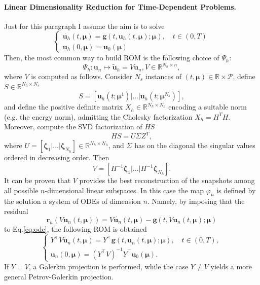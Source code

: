 \documentclass[11pt]{article}
\begin{document}
\paragraph{Linear Dimensionality Reduction for Time-Dependent Problems.} Just for this paragraph I assume the aim is to solve
\begin{equation}
\label{eq:ode}
    \begin{cases}
    \dot{\mathbf u_h}(t, \boldsymbol \mu) = \mathbf g(t, \mathbf u_h(t, \boldsymbol \mu); \boldsymbol \mu), \quad t\in(0,T)\\
    \mathbf u_h(0, \boldsymbol \mu) = \mathbf u_0(\boldsymbol \mu)
    \end{cases}
\end{equation}
Then, the most common way to build ROM is the following choice of $\Psi_h$: 
$$\Psi_h : \mathbf u_n \mapsto \tilde{\mathbf u}_h = V \mathbf u_n, V \in \mathbb R^{N_h \times n},$$
where $V$ is computed as follows. Consider $N_s$ instances of $(t, \boldsymbol \mu) \in \mathbb R \times \mathcal P$, define $S\in \mathbb R^{N_h\times N_s}$
$$S=[\mathbf u_h(t; \boldsymbol \mu^1)|...|\mathbf u_h(t; \boldsymbol \mu^{N_s})],$$
and define the positive definite matrix $X_h \in \mathbb R^{N_h\times N_h}$ encoding a suitable norm (e.g. the energy norm), admitting the Cholesky factorization $X_h=H^TH$. Moreover, compute the SVD factorization of $HS$
$$HS=U\Sigma Z^T,$$
where $U=[\boldsymbol \zeta_1|...|\boldsymbol \zeta_{N_h}] \in \mathbb R^{N_h\times N_h}$, and $\Sigma$ has on the diagonal the singular values ordered in decreasing order. Then
$$V=[H^{-1}\boldsymbol \zeta_1|...|H^{-1}\boldsymbol \zeta_{N_h} ].$$
It can be proven that $V$ provides the best reconstruction of the snapshots among all possible $n$-dimensional linear subspaces. In this case the map $\varphi_n$ is defined by the solution a system of ODEs of dimension $n$. Namely, by imposing that the residual
\begin{equation}
    \mathbf r_h(V \mathbf u_n(t, \boldsymbol \mu)) = V \dot{\mathbf u_n}(t, \boldsymbol \mu) - \mathbf g(t, V \mathbf u_n(t, \boldsymbol \mu); \boldsymbol \mu)
\end{equation}
to Eq.\ref{eq:ode}, the following ROM is obtained
\begin{equation}
        \begin{cases}
    Y^\top V \dot{\mathbf u_n}(t, \boldsymbol \mu) = Y^\top \mathbf g(t, \mathbf u_n(t, \boldsymbol \mu); \boldsymbol \mu), \quad t\in(0,T),\\
    \mathbf u_n(0, \boldsymbol \mu) = (Y^\top V)^{-1} Y^\top \mathbf u_0(\boldsymbol \mu).
    \end{cases}
\end{equation}
If $Y = V$, a Galerkin projection is performed, while the case $Y \neq V$ yields a more general Petrov-Galerkin projection.
\end{document}
